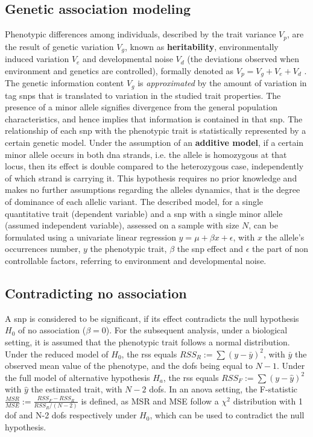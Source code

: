 \subsection{Genetic association modeling}
Phenotypic differences among individuals, described by the trait variance $V_p$,  are the result of genetic variation $V_g$, known as \textbf{heritability}, environmentally induced variation $V_e$ and developmental noise $V_d$ (the deviations observed when environment and genetics are controlled), formally denoted as $V_p=V_g+V_e+V_d$ \cite{Vogt2020}. The genetic information content $V_g$ is \textit{approximated} by the amount of variation in tag \acp{snp} that is translated to variation in the studied trait properties.  The presence of a minor allele signifies divergence from the general population characteristics, and hence implies that information is contained in that \ac{snp}.  The relationship of each \ac{snp} with the phenotypic trait is statistically represented by a certain genetic model. Under the assumption of an \textbf{additive model}, if a certain minor allele occurs in both \ac{dna} strands, i.e. the allele is homozygous at that locus, then its effect is double compared to the heterozygous case, independently of which strand is carrying it. This hypothesis requires no prior knowledge and makes no further assumptions regarding the alleles dynamics, that is the degree of dominance of each allelic variant.  The described model, for a single quantitative trait (dependent variable) and a \ac{snp} with a single minor allele (assumed independent variable), assessed on a sample with size $N$, can be formulated using a univariate linear regression $y = \mu + \beta x + \epsilon$, with $x$ the allele's occurrences number, $y$ the phenotypic trait, $\beta$ the \ac{snp} effect and $\epsilon$ the part of non controllable factors, referring to environment and developmental noise. 

\subsection{Contradicting no association}
A \ac{snp} is considered to be significant, if its effect contradicts the null hypothesis $H_0$ of no association ($\beta=0$). For the subsequent analysis, under a biological setting, it is assumed that the phenotypic trait follows a normal distribution. Under the reduced model of $H_0$, the \ac{rss} equals $RSS_R:=\sum{(y-\bar{y})^2}$, with $\bar{y}$ the observed mean value of the phenotype, and the \acp{dof} being equal to $N-1$. Under the full model of alternative hypothesis $H_a$, the \ac{rss} equals $RSS_F:=\sum{(y-\hat{y})^2}$ with $\hat{y}$ the estimated trait, with $N-2$ \acp{dof}. In an \ac{anova} setting, the F-statistic $\frac{MSR}{MSE}:=\frac{RSS_F-RSS_R}{RSS_R/(N-2)}$ is defined, as MSR and MSE follow a $\chi^2$ distribution with 1 \ac{dof} and N-2 \acp{dof} respectively under $H_0$, which can be used to contradict the null hypothesis. 

